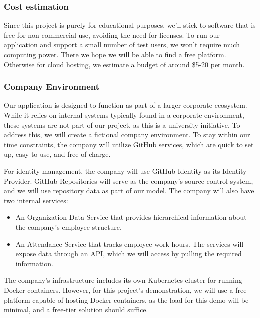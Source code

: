 \documentclass[conference]{IEEEtran}
\begin{document}
            \subsubsection{Cost estimation}
            
                Since this project is purely for educational purposes, we’ll stick to software that is free for non-commercial use, avoiding the need for licenses. To run our application and support a small number of test users, we won’t require much computing power. There we hope we will be able to find a free platform. Otherwise for cloud hosting, we estimate a budget of around \$5-20 per month.
                \newline

            \subsubsection{Company Environment}
            
                Our application is designed to function as part of a larger corporate ecosystem. While it relies on internal systems typically found in a corporate environment, these systems are not part of our project, as this is a university initiative. To address this, we will create a fictional company environment. To stay within our time constraints, the company will utilize GitHub services, which are quick to set up, easy to use, and free of charge.
    
                For identity management, the company will use GitHub Identity as its Identity Provider. GitHub Repositories will serve as the company's source control system, and we will use repository data as part of our model. The company will also have two internal services:
                
                \begin{itemize}
                    \item An Organization Data Service that provides hierarchical information about the company's employee structure.
                    \item An Attendance Service that tracks employee work hours. The services will expose data through an API, which we will access by pulling the required information.
                \end{itemize}
                
                The company’s infrastructure includes its own Kubernetes cluster for running Docker containers. However, for this project's demonstration, we will use a free platform capable of hosting Docker containers, as the load for this demo will be minimal, and a free-tier solution should suffice.
            
\end{document}
